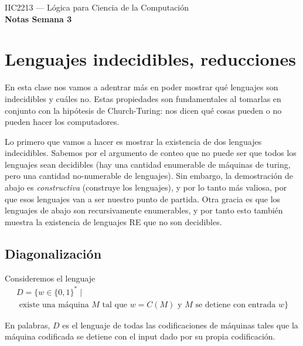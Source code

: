 \documentclass[12pt]{article}
\begin{document}

\vspace*{5mm}
\begin{center}
{ IIC2213 --- Lógica para Ciencia de la Computación} \\
\vspace{3mm}
{\Large\bf Notas Semana 3} \\
\vspace{2mm}
\end{center}




\section{Lenguajes indecidibles, reducciones}

En esta clase nos vamos a adentrar más en poder mostrar qué lenguajes son indecidibles y cuáles no. Estas propiedades son fundamentales 
al tomarlas en conjunto con la hipótesis de Church-Turing: nos dicen qué cosas pueden o no pueden hacer los computadores. 

Lo primero que vamos a hacer es mostrar la existencia de dos lenguajes indecidibles. Sabemos por el argumento de conteo que no puede ser que todos los lenguajes sean 
decidibles (hay una cantidad enumerable de máquinas de turing, pero una cantidad no-numerable de lenguajes). Sin embargo, la demostración de abajo es \emph{constructiva} 
(construye los lenguajes), y por lo tanto más valiosa, por que esos lenguajes van a ser nuestro punto de partida. Otra gracia es que los lenguajes de abajo son recursivamente enumerables, 
y por tanto esto también muestra la existencia de lenguajes RE que no son decidibles. 

\subsection{Diagonalización}

Consideremos el lenguaje 
\begin{multline*}
D = \{w \in \{0,1\}^* \mid \\ 
\text{ existe una máquina } M \text{ tal que } w = C(M) \text{ y } M \text{ se detiene con entrada } w\}
\end{multline*}

En palabras, $D$ es el lenguaje de todas las codificaciones de máquinas tales que la máquina codificada se detiene con el input dado por su propia codificación. 
\end{document}

